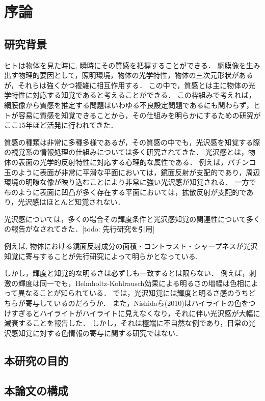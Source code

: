 \chapter{序論}
    \section{研究背景}

    ヒトは物体を見た時に, 瞬時にその質感を把握することができる．
    網膜像を生み出す物理的要因として，照明環境，物体の光学特性，物体の三次元形状があるが，それらは強くかつ複雑に相互作用する．
    この中で，質感とは主に物体の光学特性に対応する知覚であると考えることができる．
    この枠組みで考えれば，網膜像から質感を推定する問題はいわゆる不良設定問題であるにも関わらず，ヒトが容易に質感を知覚できることから，その仕組みを明らかにするための研究がここ15年ほど活発に行われてきた．

    質感の種類は非常に多種多様であるが\cite{Material}，その質感の中でも，光沢感を知覚する際の視覚系の情報処理の仕組みについては多く研究されてきた．
    光沢感とは，物体の表面の光学的反射特性に対応する心理的な属性である．
    例えば，パチンコ玉のように表面が非常に平滑な平面においては，鏡面反射が支配的であり，周辺環境の明瞭な像が映り込むことにより非常に強い光沢感が知覚される．
    一方で布のように表面に凹凸が多く存在する平面においては，拡散反射が支配的であり，光沢感はほとんど知覚されない．

    光沢感については，多くの場合その輝度条件と光沢感知覚の関連性について多くの報告がなされてきた．[todo: 先行研究を引用]

    例えば, 物体における鏡面反射成分の面積・コントラスト・シャープネスが光沢知覚に寄与することが先行研究によって明らかとなっている.


    
    しかし，輝度と知覚的な明るさは必ずしも一致するとは限らない．
    例えば，刺激の輝度は同一でも，Helmholtz-Kohlrausch効果による明るさの増幅は色相によって異なることが知られている．
    では，光沢知覚には輝度と明るさ感のうちどちらが寄与しているのだろうか．
    また，Nishidaら(2010)はハイライトの色をつけすぎるとハイライトがハイライトに見えなくなり，それに伴い光沢感が大幅に減衰することを報告した．\cite{Nishida}
    しかし，それは極端に不自然な例であり，日常の光沢感知覚に対する色情報の寄与に関する研究ではない．


    \section{本研究の目的}
    \section{本論文の構成}